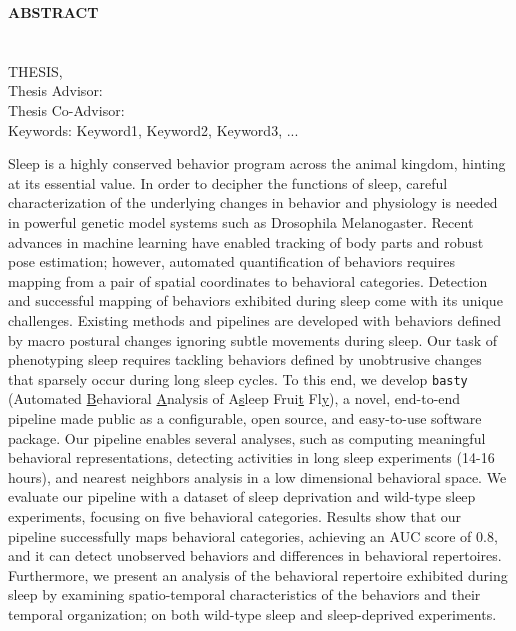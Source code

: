 \clearpage
\begin{center}
	\MakeUppercase{\textbf{Abstract}} \\ [3\baselineskip]
	\MakeUppercase{\thesistitle} \\[3\baselineskip]
	\MakeUppercase{\student} \\[\baselineskip]
	\MakeUppercase{\major \degreeabv Thesis, \month~\year} \\[\baselineskip]
	Thesis Advisor: \advisor \\
	Thesis Co-Advisor: \coadvisor \\
	[2\baselineskip]
	Keywords: Keyword1, Keyword2, Keyword3, ... \\[2\baselineskip]
\end{center}

\onehalfspacing

Sleep is a highly conserved behavior program across the animal kingdom, hinting at its essential value.
In order to decipher the functions of sleep, careful characterization of the underlying changes in behavior and physiology is needed in powerful genetic model systems such as Drosophila Melanogaster.
Recent advances in machine learning have enabled tracking of body parts and robust pose estimation; however, automated quantification of behaviors requires mapping from a pair of spatial coordinates to behavioral categories.
Detection and successful mapping of behaviors exhibited during sleep come with its unique challenges.
Existing methods and pipelines are developed with behaviors defined by macro postural changes ignoring subtle movements during sleep.
Our task of phenotyping sleep requires tackling behaviors defined by unobtrusive changes that sparsely occur during long sleep cycles.
To this end, we develop \texttt{basty} (Automated \underline{B}ehavioral \underline{A}nalysis of A\underline{s}leep Frui\underline{t} Fl\underline{y}), a novel, end-to-end pipeline made public as a configurable, open source, and easy-to-use software package.
Our pipeline enables several analyses, such as computing meaningful behavioral representations, detecting activities in long sleep experiments (14-16 hours), and nearest neighbors analysis in a low dimensional behavioral space.
We evaluate our pipeline with a dataset of sleep deprivation and wild-type sleep experiments, focusing on five behavioral categories.
Results show that our pipeline successfully maps behavioral categories, achieving an AUC score of 0.8, and it can detect unobserved behaviors and differences in behavioral repertoires.
Furthermore, we present an analysis of the behavioral repertoire exhibited during sleep by examining spatio-temporal characteristics of the behaviors and their temporal organization; on both wild-type sleep and sleep-deprived experiments.


